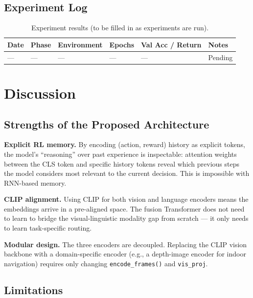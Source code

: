\documentclass[12pt, a4paper]{article}
\begin{document}
\subsection{Experiment Log}

\begin{table}[h]
\centering
\caption{Experiment results (to be filled in as experiments are run).}
\begin{tabular}{L{2cm} L{2cm} L{2.5cm} C{1.5cm} C{3cm} L{3cm}}
\toprule
\textbf{Date} & \textbf{Phase} & \textbf{Environment} & \textbf{Epochs} & \textbf{Val Acc / Return} & \textbf{Notes} \\
\midrule
— & — & — & — & — & Pending \\
\bottomrule
\end{tabular}
\end{table}

\newpage

\section{Discussion}
\label{sec:discussion}

\subsection{Strengths of the Proposed Architecture}

\textbf{Explicit RL memory.}
By encoding (action, reward) history as explicit tokens, the model's
``reasoning'' over past experience is inspectable: attention weights between
the CLS token and specific history tokens reveal which previous steps
the model considers most relevant to the current decision.
This is impossible with RNN-based memory.

\textbf{CLIP alignment.}
Using CLIP for both vision and language encoders means the embeddings arrive
in a pre-aligned space.
The fusion Transformer does not need to learn to bridge the visual-linguistic
modality gap from scratch — it only needs to learn task-specific routing.

\textbf{Modular design.}
The three encoders are decoupled.
Replacing the CLIP vision backbone with a domain-specific encoder (e.g.,
a depth-image encoder for indoor navigation) requires only changing
\texttt{encode\_frames()} and \texttt{vis\_proj}.

\subsection{Limitations}
\end{document}
